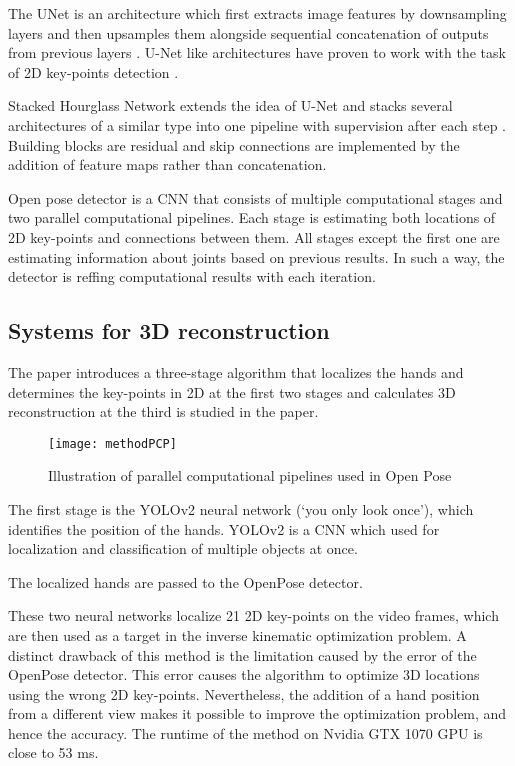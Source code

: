 The U\-Net is an architecture which first extracts image features by downsampling layers and then upsamples them alongside sequential concatenation of outputs from previous layers \cite{25}. U-Net like architectures have proven to work with the task of 2D key-points detection \cite{26}.

Stacked Hourglass Network extends the idea of U-Net and stacks several architectures of a similar type into one pipeline with supervision after each step \cite{27}. Building blocks are residual and skip connections are implemented by the addition of feature maps rather than concatenation.

Open pose detector is a CNN that consists of multiple computational stages and two parallel computational pipelines. Each stage is estimating both locations of 2D key-points and connections between them. All stages except the first one are estimating information about joints based on previous results. In such a way, the detector is reffing computational results with each iteration.

\subsection{Systems for 3D reconstruction}

The paper \cite{10} introduces a three-stage algorithm that localizes the hands and determines the key-points in 2D at the first two stages and calculates 3D reconstruction at the third is studied in the paper. 

\begin{figure}
\caption{Illustration of parallel computational pipelines used in Open Pose \cite{PCP}}
\centering
\texttt{[image: methodPCP]}
\end{figure}


The first stage is the YOLOv2 neural network (‘you only look once’), which identifies the position of the hands. YOLOv2 is a CNN which used for localization and classification of multiple objects at once.

The localized hands are passed to the OpenPose detector.

These two neural networks localize 21 2D key-points on the video frames, which are then used as a target in the inverse kinematic optimization problem. A distinct drawback of this method is the limitation caused by the error of the OpenPose detector. This error causes the algorithm to optimize 3D locations using the wrong 2D key-points. Nevertheless, the addition of a hand position from a different view makes it possible to improve the optimization problem, and hence the accuracy. The runtime of the method on Nvidia GTX 1070 GPU is close to 53 ms. 

